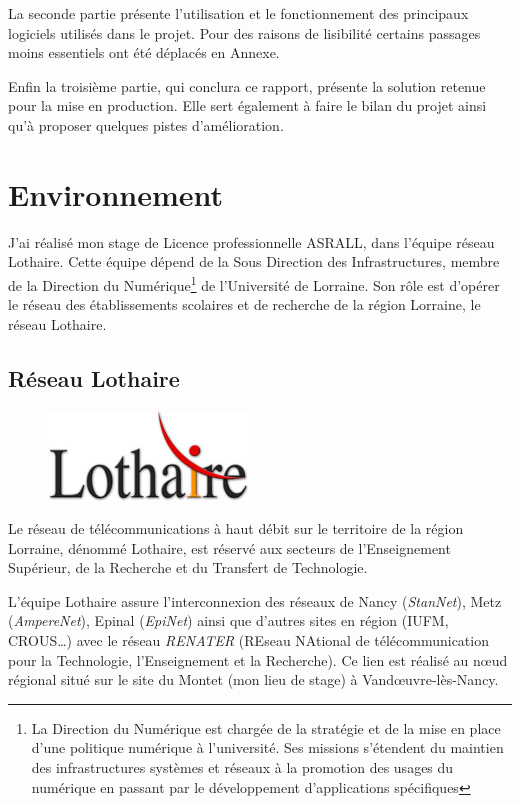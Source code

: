\documentclass[a4paper,12pt,one side,titlepage]{report}
\begin{document}
La seconde partie présente l'utilisation et le fonctionnement des principaux logiciels
utilisés dans le projet. Pour des raisons de lisibilité certains passages moins 
essentiels ont été déplacés en Annexe.

Enfin la troisième partie, qui conclura ce rapport,  présente la solution retenue 
pour la mise en production. Elle sert également à faire le bilan du projet ainsi 
qu'à proposer quelques pistes d'amélioration.


\chapter{Environnement}
J'ai réalisé mon stage de Licence professionnelle ASRALL, dans l'équipe réseau Lothaire.
Cette équipe dépend de la Sous Direction des Infrastructures, membre de la Direction 
du Numérique\footnote{La Direction du Numérique est chargée de la stratégie et de la 
mise en place d'une politique numérique à l'université. Ses missions s'étendent du maintien 
des infrastructures systèmes et réseaux à la promotion des usages du numérique en passant
par le développement d'applications spécifiques} de l'Université de Lorraine. Son rôle est 
d'opérer le réseau des établissements scolaires et de recherche de la région Lorraine, le 
réseau Lothaire.
\section{Réseau Lothaire}
\begin{figure}[H]
\center
\includegraphics{lothaire.jpg}
\end{figure}
Le réseau de télécommunications à haut débit sur le territoire de la région Lorraine, 
dénommé Lothaire, est réservé aux secteurs de l’Enseignement Supérieur, de la Recherche 
et du Transfert de Technologie. 

L'équipe Lothaire assure l’interconnexion des réseaux de Nancy (\emph{StanNet}), 
Metz (\emph{AmpereNet}), Epinal (\emph{EpiNet}) ainsi que d'autres sites en région 
(IUFM, CROUS\ldots) avec le réseau \emph{RENATER} (REseau NAtional de télécommunication 
pour la Technologie, l'Enseignement et la Recherche). Ce lien est réalisé au nœud 
régional situé sur le site du Montet (mon lieu de stage) à Vandœuvre-lès-Nancy.
\end{document}
